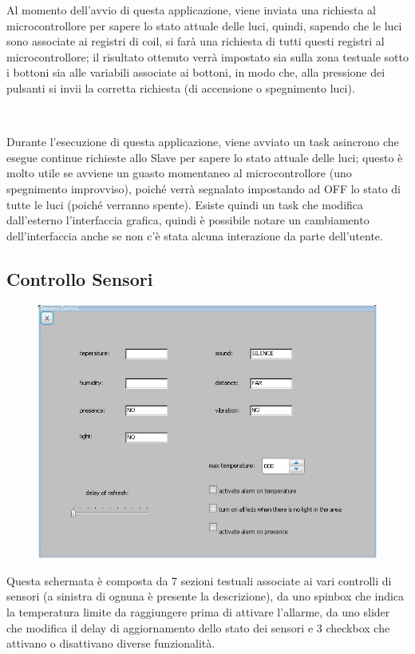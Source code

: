 \documentclass[a4paper,titlepage]{book}
\begin{document}
Al momento dell'avvio di questa applicazione, viene inviata una richiesta al microcontrollore per sapere lo stato attuale delle luci, quindi, sapendo che le luci sono associate ai registri di coil, si farà una richiesta di tutti questi registri al microcontrollore; il risultato ottenuto verrà impostato sia sulla zona testuale sotto i bottoni sia alle variabili associate ai bottoni, in modo che, alla pressione dei pulsanti si invii la corretta richiesta (di accensione o spegnimento luci).

~

Durante l'esecuzione di questa applicazione, viene avviato un task asincrono che esegue continue richieste allo Slave per sapere lo stato attuale delle luci; questo è molto utile se avviene un guasto momentaneo al microcontrollore (uno spegnimento improvviso), poiché verrà segnalato impostando ad OFF lo stato di tutte le luci (poiché verranno spente). Esiste quindi un task che modifica dall'esterno l'interfaccia grafica, quindi è possibile notare un cambiamento dell'interfaccia anche se non c'è stata alcuna interazione da parte dell'utente.


\newpage
\subsection{Controllo Sensori}

\begin{figure}[!ht]
\centering
\includegraphics[scale=0.6]{sensorgui.jpg}
\end{figure}

Questa schermata è composta da 7 sezioni testuali associate ai vari controlli di sensori (a sinistra di ognuna è presente la descrizione), da uno spinbox che indica la temperatura limite da raggiungere prima di attivare l'allarme, da uno slider che modifica il delay di aggiornamento dello stato dei sensori e 3 checkbox che attivano o disattivano diverse funzionalità.
\end{document}
